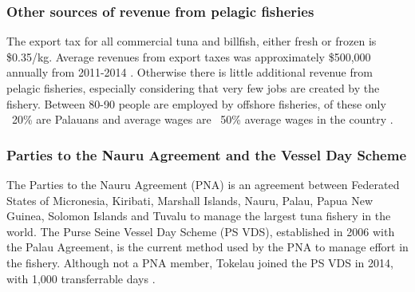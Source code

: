 \documentclass[9pttwoside,lineno]{pnas-new}
\begin{document}
\subsubsection{Other sources of revenue from pelagic fisheries}

The export tax for all commercial tuna and billfish, either fresh or frozen is \$0.35/kg. Average revenues from export taxes was approximately \$500,000 annually from 2011-2014 \citep{Gillett2016}. Otherwise there is little additional revenue from pelagic fisheries, especially considering that very few jobs are created by the fishery. Between 80-90 people are employed by offshore fisheries, of these only ~20\% are Palauans and average wages are ~50\% average wages in the country \citep{Gillett2016}.

\subsubsection{Parties to the Nauru Agreement and the Vessel Day Scheme}

The Parties to the Nauru Agreement (PNA) is an agreement between Federated States of Micronesia, Kiribati, Marshall Islands, Nauru, Palau, Papua New Guinea, Solomon Islands and Tuvalu to manage the largest tuna fishery in the world. The Purse Seine Vessel Day Scheme (PS VDS), established in 2006 with the Palau Agreement, is the current method used by the PNA to manage effort in the fishery. Although not a PNA member, Tokelau joined the PS VDS in 2014, with 1,000 transferrable days \citep{PNA2014}.
\end{document}

